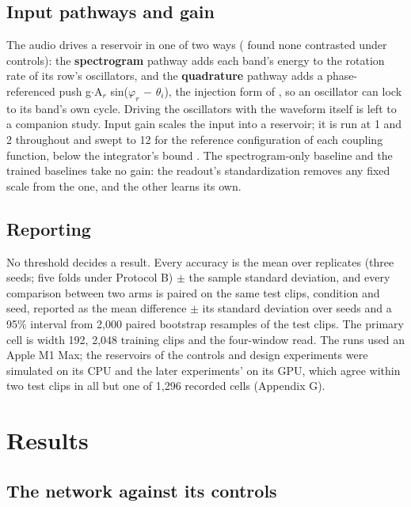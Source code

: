 \documentclass[10pt]{article}
\makeatletter
\newcounter{none} %
\newcommand{\tmlr@floatbarrier}{\par\vspace{\z@}%
  \ifx\@deferlist\@empty\else\clearpage\fi}
\let\tmlr@section\section
\renewcommand{\section}{\tmlr@floatbarrier\tmlr@section}
\makeatother
\begin{document}
\subsection{Input pathways and gain}\label{input-pathways-and-gain}

The audio drives a reservoir in one of two ways (\citet{kryski2026}
found none contrasted under controls): the \textbf{spectrogram} pathway
adds each band's energy to the rotation rate of its row's oscillators,
and the \textbf{quadrature} pathway adds a phase-referenced push
g\ensuremath{\cdot}A\ensuremath{_{r}} sin(\ensuremath{\varphi_{r}}
\ensuremath{-} \ensuremath{\theta_{i}}), the injection form of
\citet{adler1946}, so an oscillator can lock to its band's own cycle.
Driving the oscillators with the waveform itself is left to a companion
study. Input gain scales the input into a reservoir; it is run at 1 and
2 throughout and swept to 12 for the reference configuration of each
coupling function, below the integrator's bound \citep{hairer1993}. The
spectrogram-only baseline and the trained baselines take no gain: the
readout's standardization removes any fixed scale from the one, and the
other learns its own.

\subsection{Reporting}\label{reporting}

No threshold decides a result. Every accuracy is the mean over
replicates (three seeds; five folds under Protocol B) \ensuremath{\pm}
the sample standard deviation, and every comparison between two arms is
paired on the same test clips, condition and seed, reported as the mean
difference \ensuremath{\pm} its standard deviation over seeds and a 95\%
interval from 2,000 paired bootstrap resamples of the test clips. The
primary cell is width 192, 2,048 training clips and the four-window
read. The runs used an Apple M1 Max; the reservoirs of the controls and
design experiments were simulated on its CPU and the later experiments'
on its GPU, which agree within two test clips in all but one of 1,296
recorded cells (Appendix G).

\section{Results}\label{results}

\subsection{The network against its
controls}\label{the-network-against-its-controls}
\end{document}
